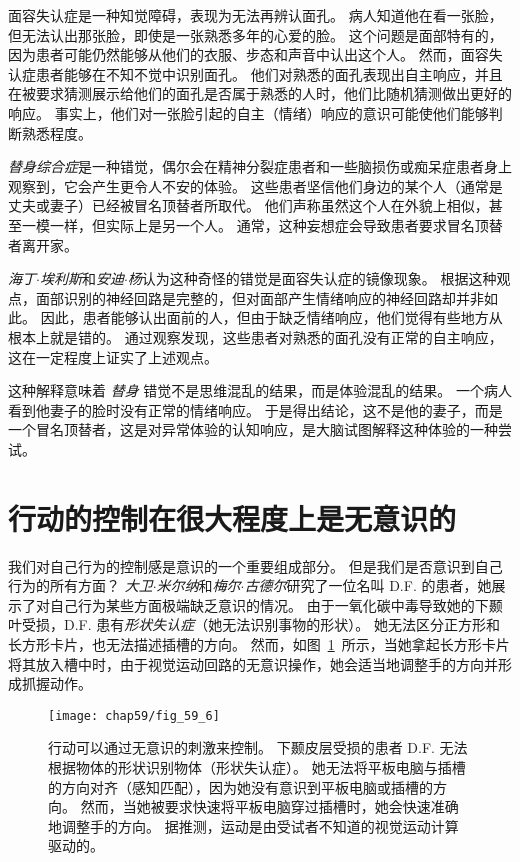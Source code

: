 面容失认症是一种知觉障碍，表现为无法再辨认面孔。
病人知道他在看一张脸，但无法认出那张脸，即使是一张熟悉多年的心爱的脸。
这个问题是面部特有的，因为患者可能仍然能够从他们的衣服、步态和声音中认出这个人。
然而，面容失认症患者能够在不知不觉中识别面孔。
他们对熟悉的面孔表现出自主响应，并且在被要求猜测展示给他们的面孔是否属于熟悉的人时，他们比随机猜测做出更好的响应。
事实上，他们对一张脸引起的自主（情绪）响应的意识可能使他们能够判断熟悉程度。


\textit{替身综合症}是一种错觉，偶尔会在精神分裂症患者和一些脑损伤或痴呆症患者身上观察到，它会产生更令人不安的体验。
这些患者坚信他们身边的某个人（通常是丈夫或妻子）已经被冒名顶替者所取代。
他们声称虽然这个人在外貌上相似，甚至一模一样，但实际上是另一个人。
通常，这种妄想症会导致患者要求冒名顶替者离开家。


\textit{海丁$\cdot$埃利斯}和\textit{安迪$\cdot$杨}认为这种奇怪的错觉是面容失认症的镜像现象。
根据这种观点，面部识别的神经回路是完整的，但对面部产生情绪响应的神经回路却并非如此。
因此，患者能够认出面前的人，但由于缺乏情绪响应，他们觉得有些地方从根本上就是错的。
通过观察发现，这些患者对熟悉的面孔没有正常的自主响应，这在一定程度上证实了上述观点。

这种解释意味着 \textit{替身} 错觉不是思维混乱的结果，而是体验混乱的结果。
一个病人看到他妻子的脸时没有正常的情绪响应。
于是得出结论，这不是他的妻子，而是一个冒名顶替者，这是对异常体验的认知响应，是大脑试图解释这种体验的一种尝试。


\section{行动的控制在很大程度上是无意识的}

我们对自己行为的控制感是意识的一个重要组成部分。
但是我们是否意识到自己行为的所有方面？
\textit{大卫$\cdot$米尔纳}和\textit{梅尔$\cdot$古德尔}研究了一位名叫 D.F. 的患者，她展示了对自己行为某些方面极端缺乏意识的情况。
由于一氧化碳中毒导致她的下颞叶受损，D.F. 患有\textit{形状失认症}（她无法识别事物的形状）。
她无法区分正方形和长方形卡片，也无法描述插槽的方向。
然而，如图~\ref{fig:59_6}~所示，当她拿起长方形卡片将其放入槽中时，由于视觉运动回路的无意识操作，她会适当地调整手的方向并形成抓握动作。


\begin{figure}[htbp]
	\centering
	\texttt{[image: chap59/fig\_59\_6]}
	\caption{行动可以通过无意识的刺激来控制。
		下颞皮层受损的患者 D.F. 无法根据物体的形状识别物体（形状失认症）。
		她无法将平板电脑与插槽的方向对齐（感知匹配），因为她没有意识到平板电脑或插槽的方向。
		然而，当她被要求快速将平板电脑穿过插槽时，她会快速准确地调整手的方向。
		据推测，运动是由受试者不知道的视觉运动计算驱动的\cite{milner2006visual}。}
	\label{fig:59_6}
\end{figure}


